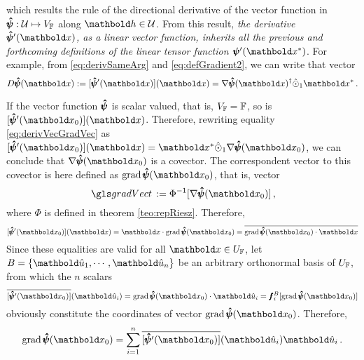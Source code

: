 which results the rule of the directional derivative of the vector function in $\pmb{\hat\psi} : \mathcal{U} \mapsto V_{\mathbb{F}}$ along $\vto{h}\in\mathcal{U}$. From this result, \emph{the derivative $\tnr{\hat\psi}'(\vto{x})$, as a linear vector function, inherits all the previous and forthcoming definitions of the linear tensor function $\fua{\tnr{\psi}'}{\vto{x}^*}$}. For example, from \eqref{eq:derivSameArg} and \eqref{eq:defGradient2}, we can write that vector
\begin{equation}\label{eq:derivSameArg2}
\fua{D\tnr{\hat\psi}}{\vto{x}} := \fua{[\tnr{\hat\psi}'(\vto{x})]}{\vto{x}}=\fua{ \nabla\tnr{\hat{\psi}}}{\vto{x}}^\dagger\hat{\odot}_1\vto{x}^*\,.
\end{equation}


If the vector function $\pmb{\hat\psi}$ is scalar valued, that is, $V_{\mathbb{F}}=\mathbb{F}$, so is $\fua{[\tnr{\hat\psi}'(\vto{x}_0)]}{\vto{x}}$. Therefore, rewriting equality \eqref{eq:derivVecGradVec} as $\fua{[\tnr{\hat\psi}'(\vto{x}_0)]}{\vto{x}} = \vto{x}^*\hat{\odot}_1\fua{ \nabla\tnr{\hat{\psi}}}{\vto{x}_0}$, we can conclude that $\fua{\nabla\tnr{\hat{\psi}}}{\vto{x}_0}$ is a covector. The correspondent vector to this covector is here defined as $\fua{\grad{\tnr{\hat{\psi}}}}{\vto{x}_0}$, that is, vector      
\begin{equation}
\gloref{gradVect}:=\Phi^{-1}[\fua{\nabla\tnr{\hat{\psi}}}{\vto{x}_0}]\,,
\end{equation}
where $\Phi$ is defined in theorem \ref{teo:repRiesz}. Therefore,
\begin{equation}\label{eq:gradScalVectFunc}
\fua{[\tnr{\hat\psi}'(\vto{x}_0)]}{\vto{x}} = \vto{x}\cdot\fua{\grad{\tnr{\hat{\psi}}}}{\vto{x}_0}=\overline{\fua{\grad{\tnr{\hat{\psi}}}}{\vto{x}_0}\cdot\vto{x}}
\end{equation}
Since these equalities are valid for all $\vto{x}\in U_\cam{F}$, let $B=\{\vun{u}_1,\cdots,\vun{u}_n\}$ be an arbitrary orthonormal basis of $U_{\mathbb{F}}$, from which the $n$ scalars
\begin{equation*}
\fua{\overline{[\tnr{\hat\psi}'(\vto{x}_0)]}}{\vun{u}_i} = \fua{\grad{\tnr{\hat{\psi}}}}{\vto{x}_0}\cdot\vun{u}_i=\vtf{f}_i^{B}[\fua{\grad{\tnr{\hat{\psi}}}}{\vto{x}_0}]
\end{equation*}
obviously constitute the coordinates of vector $\fua{\grad{\tnr{\hat{\psi}}}}{\vto{x}_0}$. Therefore, 
\begin{equation}
\fua{\grad{\tnr{\hat{\psi}}}}{\vto{x}_0} = \sum_{i=1}^n\fua{\overline{[\tnr{\hat\psi}'(\vto{x}_0)]}}{\vun{u}_i}\vun{u}_i\,.
\end{equation}
